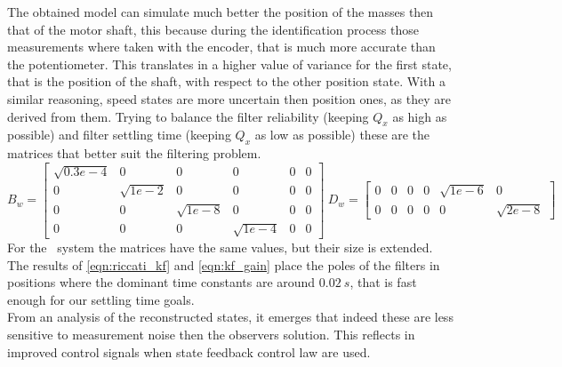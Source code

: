 The obtained model can simulate much better the position of the masses then that of the motor shaft, this because during the identification process those measurements where taken with the encoder, that is much more accurate than the potentiometer. This translates in a higher value of variance for the first state, that is the position of the shaft, with respect to the other position state. With a similar reasoning, speed states are more uncertain then position ones, as they are derived from them. Trying to balance the filter reliability (keeping $Q_x$ as high as possible) and filter settling time (keeping $Q_x$ as low as possible) these are the matrices that better suit the filtering problem.
\begin{equation}
	B_w = \begin{bmatrix}
		\sqrt{0.3e-4} & 0 & 0 & 0 & 0 & 0\\
		0 & \sqrt{1e-2} & 0 & 0 & 0 & 0 \\
		0 & 0 & \sqrt{1e-8} & 0 & 0 & 0  \\
		0 & 0 & 0 & \sqrt{1e-4} & 0 & 0
	\end{bmatrix} \
	D_w = \begin{bmatrix}
		0 & 0 & 0 & 0 & \sqrt{1e-6} & 0\\
		0 & 0 & 0 & 0 & 0 & \sqrt{2e-8} 
	\end{bmatrix} 
	\label{eqn:b_w_d_w}
\end{equation}
For the \twodof\ system the matrices have the same values, but their size is extended.\\
The results of \cref{eqn:riccati_kf} and \cref{eqn:kf_gain} place the poles of the filters in positions where the dominant time constants are around $0.02\ s$, that is fast enough for our settling time goals. \\

From an analysis of the reconstructed states, it emerges that indeed these are less sensitive to measurement noise then the observers solution. This reflects in improved control signals when state feedback control law are used. \\

